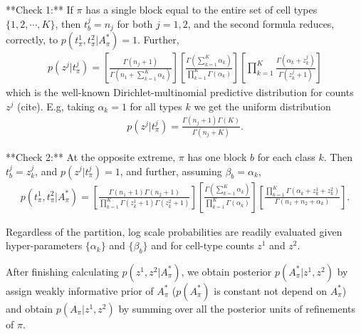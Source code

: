 \documentclass[11pt]{amsart}
\begin{document}
**Check 1:** If $\pi$ has a single block equal to the entire
 set of cell types $\{1,2, \cdots, K\}$,  then $t^j_b=n_j$ for both $j=1,2$,
and the second formula reduces, correctly, to 
$p(t^1_\pi,t^2_\pi| A_\pi^*) = 1$.  Further,
\begin{eqnarray*}
p(z^j|t^j_\pi) = 
\left[ \frac{ \Gamma(n_j +1 ) }{ \Gamma( n_1 + \sum_{k=1}^K \alpha_k ) }
\right]
\left[ \frac{\Gamma( \sum_{k =1}^K \alpha_k )}{
                \prod_{k=1}^K \Gamma( \alpha_k ) } \right]
       \left[    \prod_{k=1}^K    \frac{  \Gamma(\alpha_k + z^j_k)}{
                \Gamma(z^j_k + 1 )}\right]
\end{eqnarray*}
which is the well-known Dirichlet-multinomial predictive distribution
for counts $z^j$ (cite).  E.g, taking $\alpha_k=1$ for all types $k$ 
we get the uniform distribution
\begin{eqnarray*}
p(z^j|t^j_\pi) = 
 \frac{ \Gamma(n_j +1 ) \Gamma(K) }{ \Gamma( n_j + K ) }.
\end{eqnarray*}

**Check 2:** At the opposite  extreme, $\pi$  has one block $b$ for each
 class $k$. Then $t^j_b = z^j_k$, and $p(z^j|t^j_\pi) = 1$, and 
further, assuming $\beta_b = \alpha_k$,
\begin{eqnarray*}
p(t^1_\pi,t^2_\pi| A_\pi^*) =
 \left[ \frac{ \Gamma(n_1+1) \Gamma(n_2+1) }{ \prod_{k=1}^K 
   \Gamma(z^1_k+1) 
   \Gamma( z^2_k + 1 )} \right] 
\left[ \frac{\Gamma( \sum_{k=1}^K \alpha_k  )}{
   \prod_{k=1}^K \Gamma(\alpha_k )} \right] 
 \left[ \frac{ \prod_{k=1}^K \Gamma( \alpha_k + z^1_k + z^2_k )}{
	\Gamma( n_1 + n_2 + \alpha_k  )} \right].
\end{eqnarray*}
\cite{ref:bayesC}

 Regardless of the partition,
log scale probabilities are readily evaluated 
given hyper-parameters $\{ \alpha_k \}$ and $\{ \beta_b \}$ and for
cell-type counts $z^1$ and $z^2$. 

After finishing calculating $p(z^1,z^2|A^*_\pi)$, we obtain posterior $p(A^*_\pi|z^1,z^2)$ by assign weakly informative prior of $A^*_\pi$ ($p(A_\pi^*)$ is constant not depend on $A_\pi^*$) and obtain $p(A_\pi | z^1, z^2)$ by summing over all the posterior units of refinements of $\pi$. \\
\end{document}
